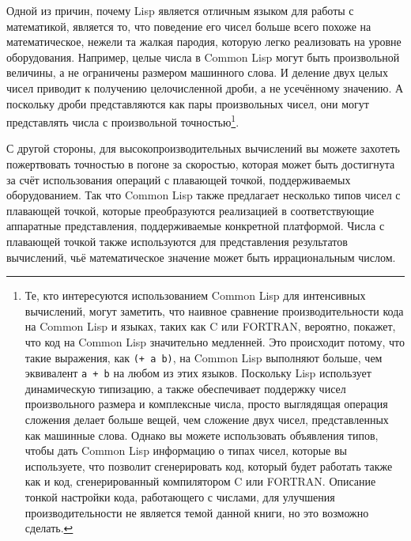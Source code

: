 Одной из причин, почему Lisp является отличным языком для работы с математикой, является
то, что поведение его чисел больше всего похоже на математическое, нежели та жалкая
пародия, которую легко реализовать на уровне оборудования.  Например, целые числа в Common
Lisp могут быть произвольной величины, а не ограничены размером машинного
слова.  И деление двух целых чисел приводит к получению
целочисленной дроби, а не усечённому значению.  А поскольку дроби представляются как пары
произвольных чисел, они могут представлять числа с произвольной точностью\footnote{Те,
  кто интересуются использованием Common Lisp для интенсивных вычислений, могут заметить,
  что наивное сравнение производительности кода на Common Lisp и языках, таких как C или
  FORTRAN, вероятно, покажет, что код на Common Lisp значительно медленней.  Это происходит
  потому, что такие выражения, как \lstinline{(+ a b)}, на Common Lisp выполняют больше, чем
  эквивалент \lstinline{a + b} на любом из этих языков.  Поскольку Lisp использует динамическую
  типизацию, а также обеспечивает поддержку чисел произвольного размера и комплексные
  числа, просто выглядящая операция сложения делает больше вещей, чем сложение двух
  чисел, представленных как машинные слова.  Однако вы можете использовать объявления
  типов, чтобы дать Common Lisp информацию о типах чисел, которые вы используете, что
  позволит сгенерировать код, который будет работать также как и код, сгенерированный
  компилятором C или FORTRAN.  Описание тонкой настройки кода, работающего с числами, для
  улучшения производительности не является темой данной книги, но это возможно сделать.}\hspace{\footnotenegspace}.

С другой стороны, для высокопроизводительных вычислений вы можете захотеть пожертвовать
точностью в погоне за скоростью, которая может быть достигнута за счёт использования
операций с плавающей точкой, поддерживаемых оборудованием.  Так что Common Lisp также
предлагает несколько типов чисел с плавающей точкой, которые преобразуются реализацией в
соответствующие аппаратные представления, поддерживаемые конкретной
платформой.  Числа с плавающей точкой также используются для
представления результатов вычислений, чьё математическое значение может быть
иррациональным числом.

